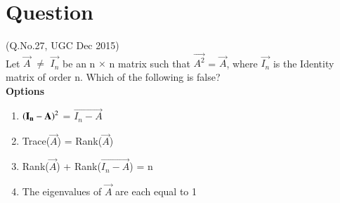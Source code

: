 \documentclass[journal,12pt,twocolumn]{IEEEtran}
\begin{document}
\section*{\textbf{Question}}
(Q.No.27, UGC Dec 2015)\\
Let $\vec{A}$ $\neq$ $\vec{I_n}$ be an n $\times$ n matrix such that $\vec{A^2}$ = $\vec{A}$, where $\vec{I_n}$ is the Identity matrix of order n. Which of the following is false?\\
\textbf{Options}
\begin{enumerate}
\item $\left(\mathbf{I_n-A}\right)^2$ = $\vec{I_n - A}$
\item Trace($\vec{A}$) = Rank($\vec{A}$) 
\item Rank($\vec{A}$) + Rank($\vec{I_n - A}$) = n
\item The eigenvalues of $\vec{A}$ are each equal to 1
\end{enumerate}
\end{document}
